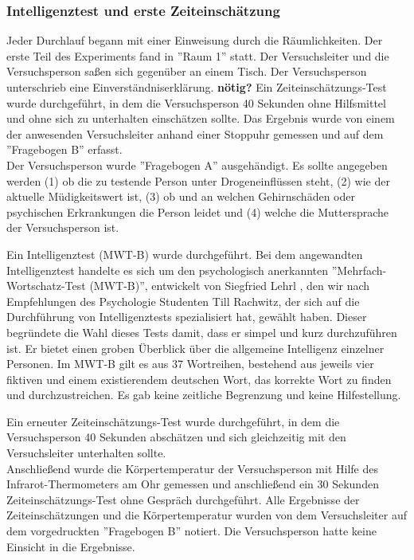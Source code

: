 \documentclass{Paper}
\begin{document}
\subsubsection{Intelligenztest und erste Zeiteinschätzung}
Jeder Durchlauf begann mit einer Einweisung durch die Räumlichkeiten. Der erste Teil des
Experiments fand in ''Raum 1'' statt. Der Versuchsleiter und
die Versuchsperson saßen sich gegenüber an einem Tisch. Der Versuchsperson unterschrieb eine
Einverständniserklärung. \textbf{nötig?}
Ein Zeiteinschätzungs-Test wurde durchgeführt, in dem die
Versuchsperson 40 Sekunden ohne Hilfsmittel und ohne sich zu unterhalten einschätzen sollte.
Das Ergebnis wurde von einem der anwesenden Versuchsleiter anhand einer Stoppuhr
gemessen und auf dem ''Fragebogen B'' erfasst. \\
Der Versuchsperson wurde ''Fragebogen A'' ausgehändigt. Es sollte angegeben werden (1) ob die zu testende Person unter Drogeneinflüssen steht, (2) wie der aktuelle Müdigkeitswert ist, (3) ob und an welchen Gehirnschäden oder psychischen Erkrankungen die Person leidet und (4) welche die
Muttersprache der Versuchsperson ist.

Ein Intelligenztest (MWT-B) wurde durchgeführt. Bei dem angewandten Intelligenztest handelte es sich um den psychologisch anerkannten ''Mehrfach-Wortschatz-Test (MWT-B)'', entwickelt von Siegfried Lehrl \cite{MWT-B}, den wir nach Empfehlungen des Psychologie Studenten Till Rachwitz, der sich auf die Durchführung von Intelligenztests spezialisiert hat, gewählt haben. Dieser begründete die Wahl dieses Tests damit, dass er simpel und kurz durchzuführen ist. Er bietet einen groben Überblick über die allgemeine Intelligenz einzelner Personen. Im MWT-B gilt es aus 37 Wortreihen, bestehend aus jeweils vier fiktiven und einem existierendem deutschen Wort, das korrekte Wort zu finden und durchzustreichen. Es gab keine zeitliche Begrenzung und keine Hilfestellung.

Ein erneuter Zeiteinschätzungs-Test wurde durchgeführt, in dem die Versuchsperson 40 Sekunden abschätzen und sich gleichzeitig mit den Versuchsleiter unterhalten sollte. \\
Anschließend wurde die Körpertemperatur der Versuchsperson mit Hilfe des Infrarot-Thermometers am Ohr gemessen und anschließend ein 30 Sekunden
Zeiteinschätzungs-Test ohne Gespräch durchgeführt. Alle Ergebnisse der Zeiteinschätzungen und die
Körpertemperatur wurden von dem Versuchsleiter auf dem vorgedruckten ''Fragebogen B''
notiert. Die Versuchsperson hatte keine Einsicht in die Ergebnisse.
\end{document}
